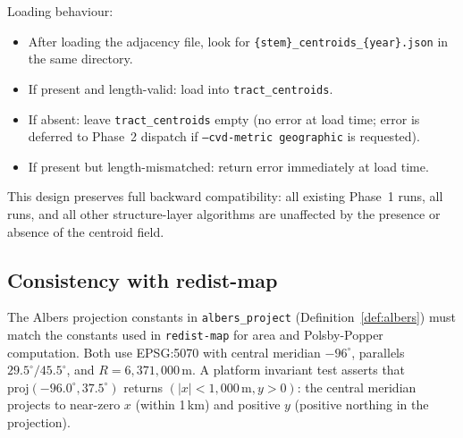 Loading behaviour:
\begin{itemize}
\item After loading the adjacency file, look for
  \texttt{\{stem\}\_centroids\_\{year\}.json} in the same directory.
\item If present and length-valid: load into \texttt{tract\_centroids}.
\item If absent: leave \texttt{tract\_centroids} empty (no error at load
  time; error is deferred to Phase~2 dispatch if \texttt{--cvd-metric geographic}
  is requested).
\item If present but length-mismatched: return error immediately at load time.
\end{itemize}

This design preserves full backward compatibility: all existing Phase~1
\cvd{} runs, all \metis{} runs, and all other structure-layer algorithms
are unaffected by the presence or absence of the centroid field.

\subsection{Consistency with redist-map}

The Albers projection constants in \texttt{albers\_project}
(Definition~\ref{def:albers}) must match the constants used in
\texttt{redist-map} for area and Polsby-Popper computation.
Both use EPSG:5070 with central meridian $-96^{\circ}$, parallels
$29.5^{\circ}/45.5^{\circ}$, and $R = 6{,}371{,}000$\,m.
A platform invariant test asserts that
$\mathrm{proj}(-96.0^{\circ}, 37.5^{\circ})$ returns $(|x| < 1{,}000\,\mathrm{m}, y > 0)$:
the central meridian projects to near-zero $x$ (within 1\,km) and positive $y$
(positive northing in the projection).
